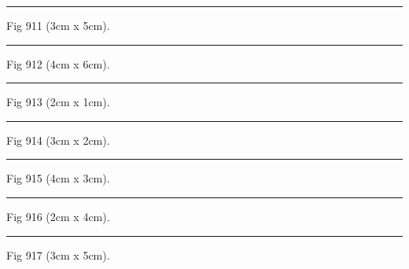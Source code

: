 \documentclass[a4paper,11pt]{article}
\begin{document}
\begin{swarmwrap}%
  \begin{minipage}[t]{3cm}
    \centering
    \rule{\linewidth}{5cm}
    {\footnotesize Fig 911 (3cm x 5cm).}
  \end{minipage}%
\end{swarmwrap}%
\swarmwrapnext
\lipsum[11]%

\begin{swarmwrap}%
  \begin{minipage}[t]{4cm}
    \centering
    \rule{\linewidth}{6cm}
    {\footnotesize Fig 912 (4cm x 6cm).}
  \end{minipage}%
\end{swarmwrap}%
\swarmwrapnext
\lipsum[12]%

\begin{swarmwrap}%
  \begin{minipage}[t]{2cm}
    \centering
    \rule{\linewidth}{1cm}
    {\footnotesize Fig 913 (2cm x 1cm).}
  \end{minipage}%
\end{swarmwrap}%
\swarmwrapnext
\lipsum[13]%

\begin{swarmwrap}%
  \begin{minipage}[t]{3cm}
    \centering
    \rule{\linewidth}{2cm}
    {\footnotesize Fig 914 (3cm x 2cm).}
  \end{minipage}%
\end{swarmwrap}%
\swarmwrapnext
\lipsum[14]%

\begin{swarmwrap}%
  \begin{minipage}[t]{4cm}
    \centering
    \rule{\linewidth}{3cm}
    {\footnotesize Fig 915 (4cm x 3cm).}
  \end{minipage}%
\end{swarmwrap}%
\swarmwrapnext
\lipsum[15]%

\begin{swarmwrap}%
  \begin{minipage}[t]{2cm}
    \centering
    \rule{\linewidth}{4cm}
    {\footnotesize Fig 916 (2cm x 4cm).}
  \end{minipage}%
\end{swarmwrap}%
\swarmwrapnext
\lipsum[16]%

\begin{swarmwrap}%
  \begin{minipage}[t]{3cm}
    \centering
    \rule{\linewidth}{5cm}
    {\footnotesize Fig 917 (3cm x 5cm).}
  \end{minipage}%
\end{swarmwrap}%
\swarmwrapnext
\lipsum[17]%
\end{document}
